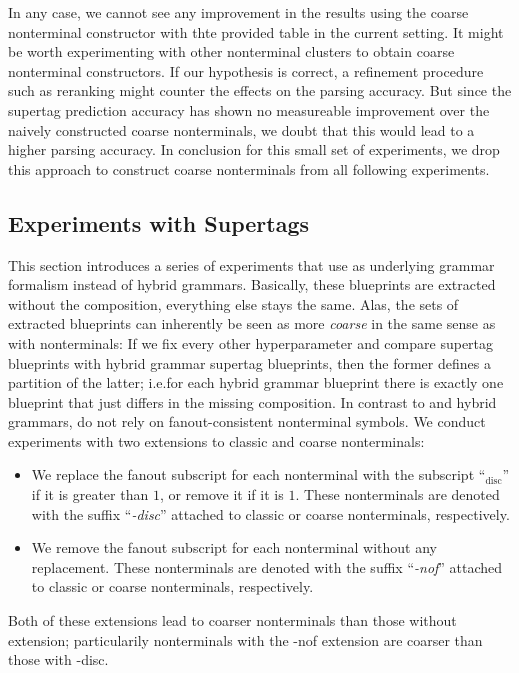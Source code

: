 \documentclass[../../document.tex]{subfiles}
\begin{document}
    In any case, we cannot see any improvement in the results using the coarse nonterminal constructor with thte provided table in the current setting.
    It might be worth experimenting with other nonterminal clusters to obtain coarse nonterminal constructors.
    If our hypothesis is correct, a refinement procedure such as reranking might counter the effects on the parsing accuracy.
    But since the supertag prediction accuracy has shown no measureable improvement over the naively constructed coarse nonterminals, we doubt that this would lead to a higher parsing accuracy.
    In conclusion for this small set of experiments, we drop this approach to construct coarse nonterminals from all following experiments. 
    

    \subsection{Experiments with  Supertags}
    This section introduces a series of experiments that use  as underlying grammar formalism instead of hybrid grammars.
    Basically, these blueprints are extracted without the  composition, everything else stays the same.
    Alas, the sets of extracted blueprints can inherently be seen as more \emph{coarse} in the same sense as with nonterminals:
        If we fix every other hyperparameter and compare  supertag blueprints with hybrid grammar supertag blueprints, then the former defines a partition of the latter; i.e.\@ for each hybrid grammar blueprint there is exactly one  blueprint that just differs in the missing composition.
    In contrast to  and hybrid grammars,  do not rely on fanout-consistent nonterminal symbols.
    We conduct experiments with two extensions to classic and coarse nonterminals:
    \begin{itemize}
        \item We replace the fanout subscript for each nonterminal with the subscript ``\(_{\text{disc}}\)'' if it is greater than \(1\), or remove it if it is \(1\). These nonterminals are denoted with the suffix ``\emph{-disc}'' attached to classic or coarse nonterminals, respectively.
        \item We remove the fanout subscript for each nonterminal without any replacement. These nonterminals are denoted with the suffix ``\emph{-nof}'' attached to classic or coarse nonterminals, respectively.
    \end{itemize}
    Both of these extensions lead to coarser nonterminals than those without extension; particularily nonterminals with the -nof extension are coarser than those with -disc.
\end{document}
